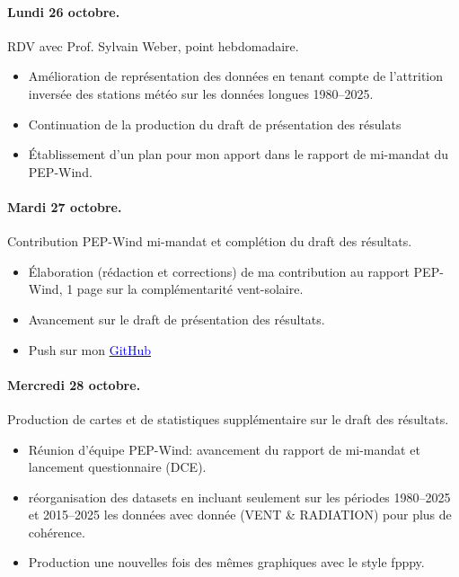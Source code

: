 \documentclass[11pt, a4paper]{article}
\begin{document}
\paragraph{Lundi 26 octobre.} RDV avec Prof. Sylvain Weber, point hebdomadaire.
\begin{itemize}
    \item Amélioration de représentation des données en tenant compte de l'attrition inversée des stations météo sur les données longues 1980--2025.
    \item Continuation de la production du draft de présentation des résulats 
    \item Établissement d'un plan pour mon apport dans le rapport de mi-mandat du PEP-Wind.
\end{itemize}

\paragraph{Mardi 27 octobre.} Contribution PEP-Wind mi-mandat et complétion du draft des résultats.
\begin{itemize}
    \item Élaboration (rédaction et corrections) de ma contribution au rapport PEP-Wind, 1 page sur la complémentarité vent-solaire. 
    \item Avancement sur le draft de présentation des résultats. 
    \item Push sur mon \href{https://github.com/LeLubb/Predoc-HEG/tree/main/Reports/PEP_Wind_mid_term_report}{\textcolor{blue}{GitHub}}
\end{itemize}

\paragraph{Mercredi 28 octobre.} Production de cartes et de statistiques supplémentaire sur le draft des résultats.
\begin{itemize}
    \item Réunion d'équipe PEP-Wind: avancement du rapport de mi-mandat et lancement questionnaire (DCE). 
    \item réorganisation des datasets en incluant seulement sur les périodes 1980--2025 et 2015--2025 les données avec donnée (VENT \& RADIATION) pour plus de cohérence.
    \item Production une nouvelles fois des mêmes graphiques avec le style fpppy.
\end{itemize}
\end{document}
